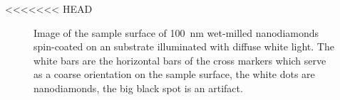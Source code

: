 <<<<<<< HEAD
	\begin{figure}[tp]
		\centering
		\caption{Image of the sample surface of \SI{100}{nm} wet-milled nanodiamonds spin-coated on an \ir substrate illuminated with diffuse white light. The white bars are the horizontal bars of the cross markers which serve as a coarse orientation on the sample surface, the white dots are nanodiamonds, the big black spot is an artifact.}
		\label{fig::ccd_cross_marker}
	\end{figure}

